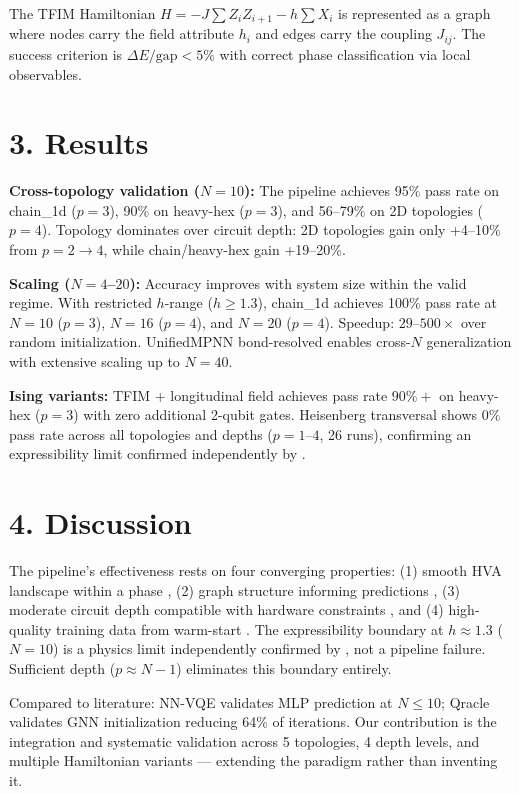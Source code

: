 \documentclass[11pt,a4paper,spanish]{book}
\begin{document}
The TFIM Hamiltonian $H = -J\sum Z_iZ_{i+1} - h\sum X_i$ is represented as a graph where nodes carry the field attribute $h_i$ and edges carry the coupling $J_{ij}$. The success criterion is $\Delta E/\text{gap} < 5\%$ with correct phase classification via local observables.

\section*{3. Results}

\textbf{Cross-topology validation ($N = 10$):} The pipeline achieves 95\% pass rate on chain\_1d ($p = 3$), 90\% on heavy-hex ($p = 3$), and 56--79\% on 2D topologies ($p = 4$). Topology dominates over circuit depth: 2D topologies gain only +4--10\% from $p = 2 \to 4$, while chain/heavy-hex gain +19--20\%.

\textbf{Scaling ($N = 4$--$20$):} Accuracy improves with system size within the valid regime. With restricted $h$-range ($h \geq 1.3$), chain\_1d achieves 100\% pass rate at $N = 10$ ($p = 3$), $N = 16$ ($p = 4$), and $N = 20$ ($p = 4$). Speedup: $29$--$500\times$ over random initialization. UnifiedMPNN bond-resolved enables cross-$N$ generalization with extensive scaling up to $N = 40$.

\textbf{Ising variants:} TFIM + longitudinal field achieves pass rate $90\%+$ on heavy-hex ($p = 3$) with zero additional 2-qubit gates. Heisenberg transversal shows 0\% pass rate across all topologies and depths ($p = 1$--$4$, 26 runs), confirming an expressibility limit confirmed independently by \citet{wiersema2020}.

\section*{4. Discussion}

The pipeline's effectiveness rests on four converging properties: (1) smooth HVA landscape within a phase \citep{mele2022}, (2) graph structure informing predictions \citep{slavin2025}, (3) moderate circuit depth compatible with hardware constraints \citep{mele2026}, and (4) high-quality training data from warm-start \citep{puig2025}. The expressibility boundary at $h \approx 1.3$ ($N = 10$) is a physics limit independently confirmed by \citet{tripathi2026}, not a pipeline failure. Sufficient depth ($p \approx N-1$) eliminates this boundary entirely.

Compared to literature: NN-VQE \citep{miao2024} validates MLP prediction at $N \leq 10$; Qracle \citep{zhang2025} validates GNN initialization reducing 64\% of iterations. Our contribution is the integration and systematic validation across 5 topologies, 4 depth levels, and multiple Hamiltonian variants --- extending the paradigm rather than inventing it.
\end{document}

